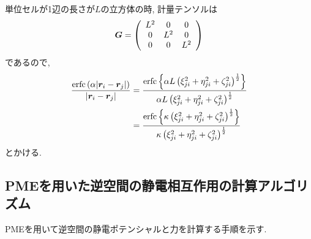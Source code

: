 単位セルが1辺の長さが$L$の立方体の時, 計量テンソルは
\begin{align}
   \bm{G}
 =
 \left(
        \begin{array}{ccc}
         L^{2} & 0     & 0     \\
         0     & L^{2} & 0     \\
         0     & 0     & L^{2} \\
        \end{array}
 \right)
 \notag
\end{align}
であるので,
\begin{align}
   \frac{\mathrm{erfc} \left(\alpha |\bm{r}_{i} - \bm{r}_{j}|\right)}{|\bm{r}_{i} - \bm{r}_{j}|}
&=
   \frac{\mathrm{erfc} \left\{\alpha L \left(\xi_{ji}^{2} + \eta_{ji}^{2} + \zeta_{ji}^{2} \right)^\frac{1}{2}\right\}}
        {\alpha L \left( \xi_{ji}^{2} + \eta_{ji}^{2} + \zeta_{ji}^{2} \right)^\frac{1}{2}}
 \notag
 \\
&=
   \frac{\mathrm{erfc} \left\{\kappa \left(\xi_{ji}^{2} + \eta_{ji}^{2} + \zeta_{ji}^{2} \right)^\frac{1}{2}\right\}}
        {\kappa \left( \xi_{ji}^{2} + \eta_{ji}^{2} + \zeta_{ji}^{2} \right)^\frac{1}{2}}
 \notag
\end{align}
とかける.
\subsection{PMEを用いた逆空間の静電相互作用の計算アルゴリズム}
PMEを用いて逆空間の静電ポテンシャルと力を計算する手順を示す.

